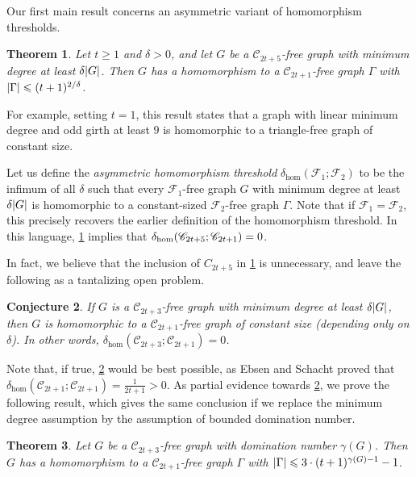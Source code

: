 \documentclass[reqno, english, 12pt]{amsart}
\theoremstyle{plain}
\newtheorem{theorem}{Theorem}[section]
\newtheorem{conjecture}[theorem]{Conjecture}
\theoremstyle{remark}
\newcommand{\cF}{\mathcal{F}}
\DeclarePairedDelimiter{\abs}{\lvert}{\rvert}
\renewcommand{\leq}{\leqslant}
\renewcommand{\geq}{\geqslant}
\newcommand\C{\mathscr{C}}
\begin{document}
Our first main result concerns an asymmetric variant of homomorphism thresholds. 
\begin{theorem}\label{thm:C3C5C7}
     Let $t \geq 1$ and $\delta > 0$, and let $G$ be a $\C_{2t+5}$-free graph with minimum degree at least $\delta \abs G$. Then $G$ has a homomorphism to a $\C_{2t+1}$-free graph $\Gamma$ with $\abs \Gamma \leq (t+1)^{2/\delta}$.
\end{theorem}
For example, setting $t=1$, this result states that a graph with linear minimum degree and odd girth at least $9$ is homomorphic to a triangle-free graph of constant size.

Let us define the \emph{asymmetric homomorphism threshold} $\delta_{\hom}(\cF_1; \cF_2)$ to be the infimum of all $\delta$ such that every $\cF_1$-free graph $G$ with minimum degree at least $\delta \abs G$ is homomorphic to a constant-sized $\cF_2$-free graph $\Gamma$.
Note that if $\cF_1=\cF_2$, this precisely recovers the earlier definition of the homomorphism threshold. In this language, \cref{thm:C3C5C7} implies that $\delta_{\hom}(\mathscr C_{2t+5}; \C_{2t+1}) = \nolinebreak 0$. 

In fact, we believe that the inclusion of $C_{2t+5}$ in \cref{thm:C3C5C7} is unnecessary, and leave the following as a tantalizing open problem. 
\begin{conjecture}\label{conj:no C7}
	If $G$ is a $\C_{2t+3}$-free graph with minimum degree at least $\delta\abs G$, then $G$ is homomorphic to a $\C_{2t+1}$-free graph of constant size (depending only on $\delta$). In other words, $\delta_{\hom}(\C_{2t+3};\C_{2t+1})=0$.
\end{conjecture}
Note that, if true, \cref{conj:no C7} would be best possible, as Ebsen and Schacht \cite{MR4078811} proved that $\delta_{\hom}(\C_{2t+1};\C_{2t+1})=\frac{1}{2t+1}>0$.
As partial evidence towards \cref{conj:no C7}, we  prove the following result, which gives the same conclusion if we replace the minimum degree assumption by the assumption of bounded domination number.
\begin{theorem}\label{thm:bounded domination}
    Let $G$ be a $\C_{2t+3}$-free graph with domination number $\gamma(G)$. Then $G$ has a homomorphism to a $\C_{2t+1}$-free graph $\Gamma$ with $\abs \Gamma \leq 3\cdot (t+1)^{\gamma(G)-1}-1$.
\end{theorem}
\end{document}
